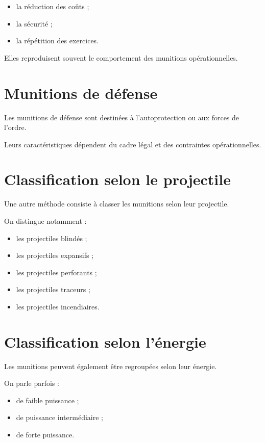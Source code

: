 \begin{itemize}
    \item la réduction des coûts ;
    \item la sécurité ;
    \item la répétition des exercices.
\end{itemize}

Elles reproduisent souvent le comportement des munitions opérationnelles.

\section{Munitions de défense}

Les munitions de défense sont destinées à l'autoprotection ou aux forces de
l'ordre.

Leurs caractéristiques dépendent du cadre légal et des contraintes
opérationnelles.

\section{Classification selon le projectile}

Une autre méthode consiste à classer les munitions selon leur projectile.

On distingue notamment :

\begin{itemize}
    \item les projectiles blindés ;
    \item les projectiles expansifs ;
    \item les projectiles perforants ;
    \item les projectiles traceurs ;
    \item les projectiles incendiaires.
\end{itemize}

\section{Classification selon l'énergie}

Les munitions peuvent également être regroupées selon leur énergie.

On parle parfois :

\begin{itemize}
    \item de faible puissance ;
    \item de puissance intermédiaire ;
    \item de forte puissance.
\end{itemize}

